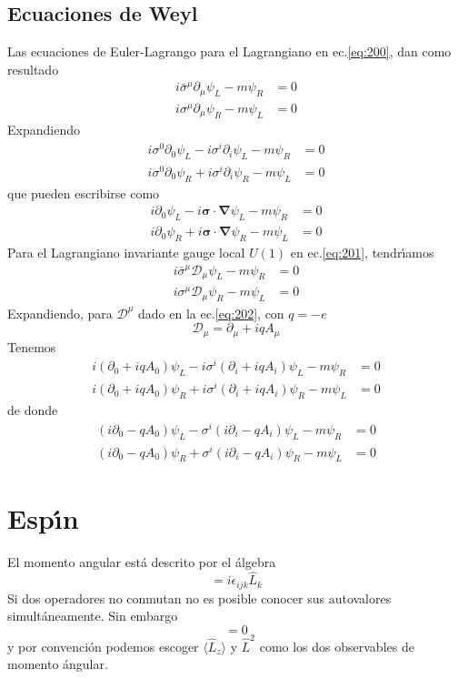 \begin{subappendices}
\subsection{Ecuaciones de Weyl}
\label{sec:ecuaciones-de-weyl}
Las ecuaciones de Euler-Lagrango para el Lagrangiano en ec.\eqref{eq:200}, dan como resultado
\begin{align}
  i\bar{\sigma}^\mu\partial_\mu\psi_L -m\psi_R &=0\nonumber\\
  i{\sigma}^\mu\partial_\mu\psi_R -m\psi_L &=0
\end{align}
Expandiendo
\begin{align}
  \label{eq:209}
   i{\sigma}^0\partial_0\psi_L-i{\sigma}^i\partial_i\psi_L -m\psi_R &=0\nonumber\\
   i{\sigma}^0\partial_0\psi_R+i{\sigma}^i\partial_i\psi_R -m\psi_L &=0
\end{align}
que pueden escribirse como
\begin{align}
  \label{eq:207}
   i\partial_0\psi_L-i\boldsymbol{\sigma}\cdot\boldsymbol{\nabla}\psi_L -m\psi_R &=0\nonumber\\
   i\partial_0\psi_R+i\boldsymbol{\sigma}\cdot\boldsymbol{\nabla}\psi_R -m\psi_L &=0
\end{align}
Para el Lagrangiano invariante gauge local $U(1)$ en ec.\eqref{eq:201}, tendr\'\i amos
\begin{align}
  i\bar{\sigma}^\mu\mathcal{D}_\mu\psi_L -m\psi_R &=0\nonumber\\
  i{\sigma}^\mu\mathcal{D}_\mu\psi_R -m\psi_L &=0
\end{align}
Expandiendo, para $\mathcal{D}^\mu$ dado en la ec.\eqref{eq:202}, con $q=-e$
\begin{equation}
  \mathcal{D}_\mu=\partial_\mu+i q A_\mu
\end{equation}
Tenemos
\begin{align}
     i(\partial_0+i q A_0)\psi_L-i{\sigma}^i(\partial_i+i q A_i)\psi_L -m\psi_R &=0\nonumber\\
   i(\partial_0+i q A_0)\psi_R+i{\sigma}^i(\partial_i+i q A_i)\psi_R -m\psi_L &=0
\end{align}
de donde
\begin{align}
\label{eq:203}
     (i\partial_0- q A_0)\psi_L-{\sigma}^i(i\partial_i-q A_i)\psi_L -m\psi_R &=0\nonumber\\
   (i\partial_0-q A_0)\psi_R+{\sigma}^i(i\partial_i-q A_i)\psi_R -m\psi_L &=0
\end{align}
\section{Esp\'\i n}
\label{sec:espin}
El momento angular est\'a descrito por el \'algebra
\begin{equation}
  [\hat L_i,\hat L_j]=i\epsilon_{ijk}\hat L_k
\end{equation}
Si dos operadores no conmutan no es posible conocer sus autovalores simult\'aneamente. Sin embargo
\begin{equation}
  [\hat L_i,\hat{L}^2]=0
\end{equation}
y por convenci\'on podemos escoger $\langle\hat L_z\rangle$ y $\hat{L}^2$ como los dos observables de momento \'angular. 


\end{subappendices}
